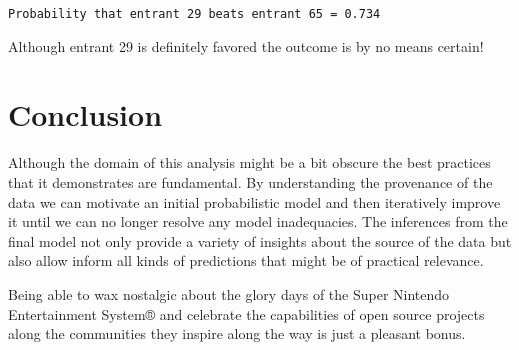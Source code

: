\documentclass[
  letterpaper,
  DIV=11,
  numbers=noendperiod]{scrartcl}
\newenvironment{Shaded}{\begin{snugshade}}{\end{snugshade}}
\newcommand{\ControlFlowTok}[1]{\textcolor[rgb]{0.00,0.23,0.31}{#1}}
\newcommand{\DecValTok}[1]{\textcolor[rgb]{0.68,0.00,0.00}{#1}}
\newcommand{\FunctionTok}[1]{\textcolor[rgb]{0.28,0.35,0.67}{#1}}
\newcommand{\NormalTok}[1]{\textcolor[rgb]{0.00,0.23,0.31}{#1}}
\newcommand{\OtherTok}[1]{\textcolor[rgb]{0.00,0.23,0.31}{#1}}
\newcommand{\SpecialCharTok}[1]{\textcolor[rgb]{0.37,0.37,0.37}{#1}}
\newcommand{\StringTok}[1]{\textcolor[rgb]{0.13,0.47,0.30}{#1}}
\begin{document}
\begin{Shaded}
\end{Shaded}

\begin{verbatim}
Probability that entrant 29 beats entrant 65 = 0.734
\end{verbatim}

Although entrant 29 is definitely favored the outcome is by no means
certain!

\section{Conclusion}\label{conclusion}

Although the domain of this analysis might be a bit obscure the best
practices that it demonstrates are fundamental. By understanding the
provenance of the data we can motivate an initial probabilistic model
and then iteratively improve it until we can no longer resolve any model
inadequacies. The inferences from the final model not only provide a
variety of insights about the source of the data but also allow inform
all kinds of predictions that might be of practical relevance.

Being able to wax nostalgic about the glory days of the Super Nintendo
Entertainment System® and celebrate the capabilities of open source
projects along the communities they inspire along the way is just a
pleasant bonus.
\end{document}
